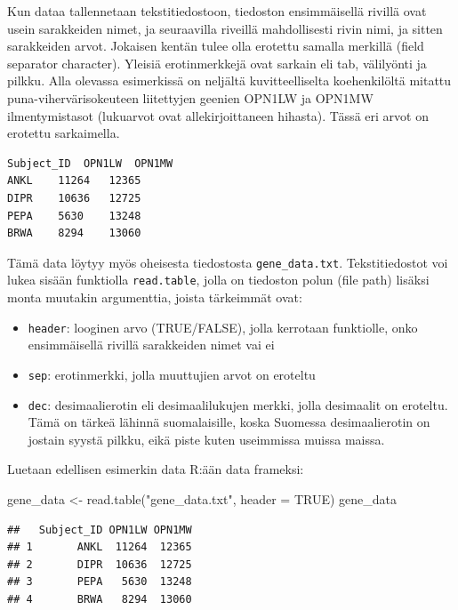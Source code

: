 \documentclass[
]{book}
\newenvironment{Shaded}{\begin{snugshade}}{\end{snugshade}}
\newcommand{\AttributeTok}[1]{\textcolor[rgb]{0.77,0.63,0.00}{#1}}
\newcommand{\ConstantTok}[1]{\textcolor[rgb]{0.00,0.00,0.00}{#1}}
\newcommand{\FunctionTok}[1]{\textcolor[rgb]{0.00,0.00,0.00}{#1}}
\newcommand{\NormalTok}[1]{#1}
\newcommand{\OtherTok}[1]{\textcolor[rgb]{0.56,0.35,0.01}{#1}}
\newcommand{\StringTok}[1]{\textcolor[rgb]{0.31,0.60,0.02}{#1}}
\providecommand{\tightlist}{%
  \setlength{\itemsep}{0pt}\setlength{\parskip}{0pt}}
\begin{document}
Kun dataa tallennetaan tekstitiedostoon, tiedoston ensimmäisellä rivillä ovat usein sarakkeiden nimet, ja seuraavilla riveillä mahdollisesti rivin nimi, ja sitten sarakkeiden arvot. Jokaisen kentän tulee olla erotettu samalla merkillä (field separator character). Yleisiä erotinmerkkejä ovat sarkain eli tab, välilyönti ja pilkku. Alla olevassa esimerkissä on neljältä kuvitteelliselta koehenkilöltä mitattu puna-vihervärisokeuteen liitettyjen geenien OPN1LW ja OPN1MW ilmentymistasot (lukuarvot ovat allekirjoittaneen hihasta). Tässä eri arvot on erotettu sarkaimella.

\begin{verbatim}
Subject_ID  OPN1LW  OPN1MW
ANKL    11264   12365
DIPR    10636   12725
PEPA    5630    13248
BRWA    8294    13060
\end{verbatim}

Tämä data löytyy myös oheisesta tiedostosta \texttt{gene\_data.txt}. Tekstitiedostot voi lukea sisään funktiolla \texttt{read.table}, jolla on tiedoston polun (file path) lisäksi monta muutakin argumenttia, joista tärkeimmät ovat:

\begin{itemize}
\tightlist
\item
  \texttt{header}: looginen arvo (TRUE/FALSE), jolla kerrotaan funktiolle, onko ensimmäisellä rivillä sarakkeiden nimet vai ei
\item
  \texttt{sep}: erotinmerkki, jolla muuttujien arvot on eroteltu
\item
  \texttt{dec}: desimaalierotin eli desimaalilukujen merkki, jolla desimaalit on eroteltu. Tämä on tärkeä lähinnä suomalaisille, koska Suomessa desimaalierotin on jostain syystä pilkku, eikä piste kuten useimmissa muissa maissa.
\end{itemize}

Luetaan edellisen esimerkin data R:ään data frameksi:

\begin{Shaded}
\begin{Highlighting}[]
\NormalTok{gene\_data }\OtherTok{\textless{}{-}} \FunctionTok{read.table}\NormalTok{(}\StringTok{"gene\_data.txt"}\NormalTok{, }\AttributeTok{header =} \ConstantTok{TRUE}\NormalTok{)}
\NormalTok{gene\_data}
\end{Highlighting}
\end{Shaded}

\begin{verbatim}
##   Subject_ID OPN1LW OPN1MW
## 1       ANKL  11264  12365
## 2       DIPR  10636  12725
## 3       PEPA   5630  13248
## 4       BRWA   8294  13060
\end{verbatim}
\end{document}
